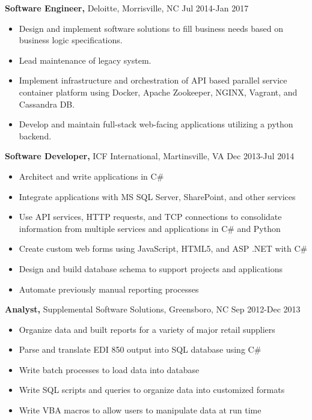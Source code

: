 \documentclass{res}
\begin{document}
\begin{resume}
  {\bf Software Engineer,} Deloitte, Morrisville, NC \hfill Jul 2014-Jan 2017
    \begin{itemize} \itemsep -2pt
     \item Design and implement software solutions to fill business needs based on business logic specifications.
     \item Lead maintenance of legacy system.
     \item Implement infrastructure and orchestration of API based parallel service container platform using Docker, Apache Zookeeper, NGINX, Vagrant, and Cassandra DB.
     \item Develop and maintain full-stack web-facing applications utilizing a python backend.
     \end{itemize}
  
  {\bf Software Developer,} ICF International, Martinsville, VA \hfill Dec 2013-Jul 2014
    \begin{itemize} \itemsep -2pt  %
      \item Architect and write applications in C\#
      \item Integrate applications with MS SQL Server, SharePoint, and other services
      \item Use API services, HTTP requests, and TCP connections to consolidate information from multiple services and applications in C\# and Python
      \item Create custom web forms using JavaScript, HTML5, and ASP .NET with C\#
      \item Design and build database schema to support projects and applications
      \item Automate previously manual reporting processes
    \end{itemize}

 
  {\bf Analyst,} Supplemental Software Solutions, Greensboro, NC \hfill  Sep 2012-Dec 2013
    \begin{itemize} \itemsep -2pt %
      \item Organize data and built reports for a variety of major retail suppliers
      \item Parse and translate EDI 850 output into SQL database using C\#
      \item Write batch processes to load data into database
      \item Write SQL scripts and queries to organize data into customized formats
      \item Write VBA macros to allow users to manipulate data at run time
    \end{itemize}


\end{resume}
\end{document}
